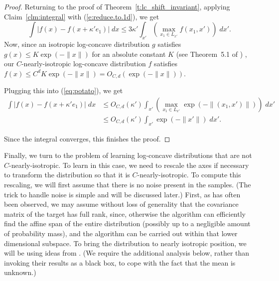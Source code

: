 \begin{proof}
Returning to the proof of Theorem~\ref{t:lc_shift_invariant}, applying
Claim~\ref{clm:integral} with (\ref{e:reduce.to.1d}), we get
\begin{equation} \label{eq:potato}
\int |f(x) - f(x + \kappa' e_1)|\; dx
 \le 3 \kappa'
 \int_{x'} \left(\max_{x_1 \in L_{x'}} f(x_1,x')\right) \; dx'.
\end{equation}
Now, since an isotropic log-concave distribution $g$ satisfies
$g(x) \leq K \exp(-\| x \|)$ for an absolute constant $K$ (see Theorem~5.1 of \cite{SaumardWellner14}) , our $C$-nearly-isotropic log-concave distribution $f$ satisfies $f(x) \leq C^d K \exp(-\|x\|) = O_{C,d}(\exp(-\|x\|))$.
Plugging this into (\ref{eq:potato}), we get
\begin{align*} \label{eq:tuber}
\int |f(x) - f(x + \kappa' e_1)|\; dx
 &\le O_{C,d}( \kappa' )
 \int_{x'} \left(\max_{x_1 \in L_{x'}} \exp(-\|(x_1,x')\|)\right) \; dx'\\
 &\le O_{C,d}( \kappa' )
 \int_{x'} \exp(-\|x'\|) \; dx'.
\end{align*}
Since the integral converges, this finishes the proof.
\end{proof}


Finally, we turn to the problem of
learning log-concave distributions that are not $C$-nearly-isotropic. To learn in this case, we need to
rescale the axes if necessary to transform the distribution so that 
it is $C$-nearly-isotropic. To compute this rescaling, we will first assume that there is no noise present in the samples. (The trick to handle noise is simple and will be discussed later.)
First, as has often been observed, we may assume without loss of
generality that the covariance matrix of the target has full rank,
since, otherwise the algorithm can efficiently find the
affine span of the entire distribution (possibly up to a negligible amount of probability mass), and the algorithm can be carried out within that lower dimensional subspace.
To bring the distribution to nearly isotropic position, we will be using ideas from 
\citep{LovaszVempala07}.  (We require the additional analysis below, rather than invoking their results as a black box, to cope with the
fact that the mean is unknown.)

